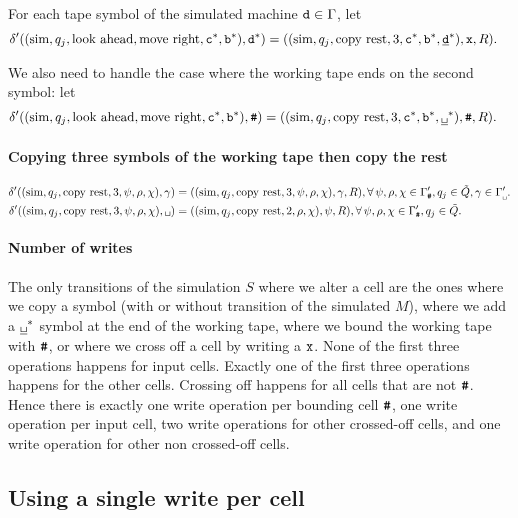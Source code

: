 For each tape symbol of the simulated machine $\texttt{d} \in \Gamma$,
let
\begin{align}
  \delta'((\text{sim}, q_j, \text{look ahead}, \text{move right}, \texttt{c}^*, \texttt{b}^*),\texttt{d}^*)
  &=((\text{sim}, q_j, \text{copy rest}, 3, \texttt{c}^*, \texttt{b}^*, \underline{\texttt{d}}^*), \texttt{x}, R).
\end{align}

We also need to handle the case where the working tape ends on the second
symbol:
let
\begin{align}
  \delta'((\text{sim}, q_j, \text{look ahead}, \text{move right}, \C, \Q),\e)
  &=((\text{sim}, q_j, \text{copy rest}, 3, \C, \Q, \BB), \e, R).
\end{align}


\paragraph{Copying three symbols of the working tape then copy the rest}
\begin{align}
  \delta'((\text{sim}, q_j, \text{copy rest}, 3, \psi, \rho, \chi), \gamma)
  &= ((\text{sim}, q_j, \text{copy rest}, 3, \psi, \rho, \chi),
  \gamma, R),
  \forall\,
  \psi,\rho,\chi \in \gpwe,
  q_j \in \qwar,
  \gamma \in \gpwb.\\
  \delta'((\text{sim}, q_j, \text{copy rest}, 3, \psi, \rho, \chi), \0{})
  &= ((\text{sim}, q_j, \text{copy rest}, 2, \rho, \chi), \psi, R),
  \forall\,
  \psi,\rho,\chi \in \gpwe,
  q_j \in \qwar.
\end{align}

\paragraph{Number of writes}
The only transitions of the simulation \TM{} $S$ where we alter a cell are the
ones where we
copy a symbol (with or without transition of the simulated \TM{} $M$), where we add a
$\BB$ symbol at the end of the working tape, where we bound the working tape
with $\texttt{\#}$, or where we cross off a cell by writing a $\texttt{x}$.
None of the first three operations happens for input cells.
Exactly one of the first three operations happens for the other
cells.
Crossing off happens for all cells that are not $\texttt{\#}$. Hence there is exactly
one write operation per bounding cell $\texttt{\#}$,
one write operation per input cell,
two write operations for other crossed-off cells,
and one write operation for other non crossed-off cells.

\subsection{Using a single write per cell}


